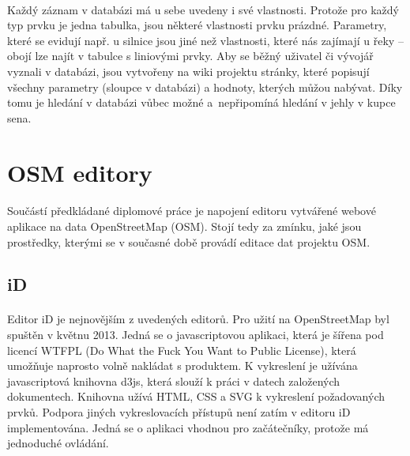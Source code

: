 \documentclass[11pt,a4paper,titlepage,oneside]{book}
\begin{document}
	\paragraph{}Každý záznam v databázi má u sebe uvedeny i své vlastnosti. Protože pro každý typ prvku je jedna tabulka, jsou některé vlastnosti prvku prázdné. Parametry, které se evidují např. u silnice jsou jiné než vlastnosti, které nás zajímají u řeky -- obojí lze najít v tabulce s liniovými prvky. Aby se běžný uživatel či vývojář vyznali v databázi, jsou vytvořeny na wiki projektu stránky, které popisují všechny parametry (sloupce v databázi) a hodnoty, kterých můžou nabývat. Díky tomu je hledání v databázi vůbec možné a~nepřipomíná hledání v jehly v kupce sena.


	\section{OSM editory} %
		\paragraph{} Součástí předkládané diplomové práce je napojení editoru vytvářené web\-ové aplikace na data OpenStreetMap (OSM). Stojí tedy za zmínku, jaké jsou prostředky, kterými se v současné době provádí editace dat projektu OSM. 
		\subsection{iD}



			\paragraph{}Editor iD je nejnovějším z uvedených editorů. Pro užití na OpenStreetMap byl spuštěn v květnu 2013. Jedná se o javascriptovou aplikaci, která je šířena pod licencí WTFPL (Do What the Fuck You Want to Public License)\cite{wiki_wtfpl}, která umožňuje naprosto volně nakládat s produktem. K vykreslení je užívána javascriptová knihovna d3js, která slouží k práci v datech založených dokumentech. Knihovna užívá HTML, CSS a SVG k vykreslení požadovaných prvků. Podpora jiných vykreslovacích přístupů není zatím v editoru iD implementována. Jedná se o aplikaci vhodnou pro začátečníky, protože má jednoduché ovládání.
\end{document}
